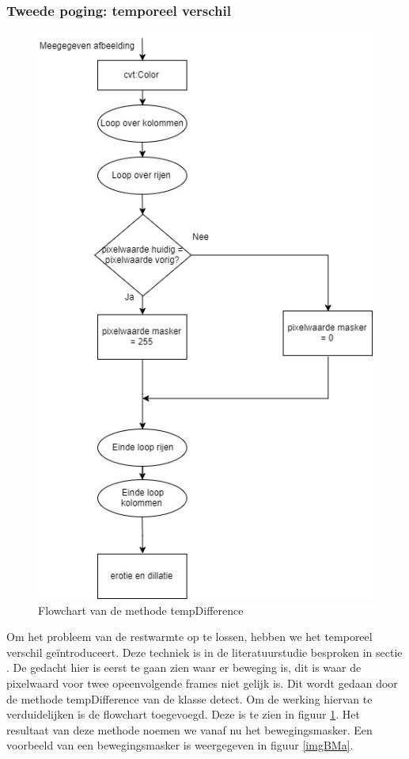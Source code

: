 \subsubsection{Tweede poging: temporeel verschil}
\begin{figure}[hbp]
	\includegraphics[scale=0.6]{FlowChart_TempDifference}
	\caption{Flowchart van de methode tempDifference}
	\label{imgFCTDi}
\end{figure}
Om het probleem van de restwarmte op te lossen, hebben we het temporeel verschil ge\"introduceert. Deze techniek is in de literatuurstudie besproken in sectie \label{refBET}. De gedacht hier is eerst te gaan zien waar er beweging is, dit is waar de pixelwaard voor twee opeenvolgende frames niet gelijk is. Dit wordt gedaan door de methode tempDifference van de klasse detect. Om de werking hiervan te verduidelijken is de flowchart toegevoegd.  Deze is te zien in figuur \ref{imgFCTDi}. Het resultaat van deze methode noemen we vanaf nu het bewegingsmasker. Een voorbeeld van een bewegingsmasker is weergegeven in figuur \ref{imgBMa}.
